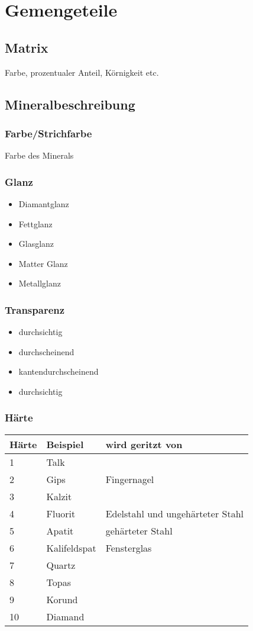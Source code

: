 \documentclass[a4, 12pt]{scrreprt}
\begin{document}
\newpage
\chapter{Gemengeteile} \label{sec:Gemengeteile}

\section{Matrix}
Farbe, prozentualer Anteil, Körnigkeit etc.

\section{Mineralbeschreibung}

\subsection{Farbe/Strichfarbe}

Farbe des Minerals

\subsection{Glanz}

\begin{itemize}
\item Diamantglanz
\item Fettglanz
\item Glasglanz
\item Matter Glanz
\item Metallglanz
\end{itemize}

\subsection{Transparenz}

\begin{itemize}
\item durchsichtig
\item durchscheinend
\item kantendurchscheinend
\item durchsichtig
\end{itemize}

\subsection{Härte}
\begin{tabular}{lll}
Härte & Beispiel & wird geritzt von\\
\hline
1 & Talk\\
2 & Gips & Fingernagel\\
3 & Kalzit\\
4 & Fluorit & Edelstahl und ungehärteter Stahl\\
5 & Apatit & gehärteter Stahl\\
6 & Kalifeldspat & Fensterglas\\
7 & Quartz\\
8 & Topas\\
9 & Korund\\
10 & Diamand\\
\end{tabular}
\end{document}
